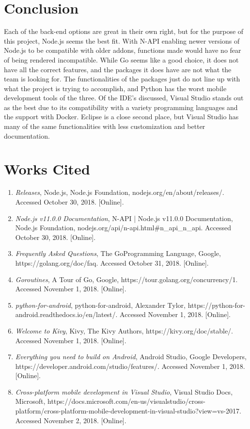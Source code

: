 \documentclass[draftclsnofoot, onecolumn, letterpaper,10pt,compsoc]{IEEEtran}
\begin{document}
\section{Conclusion}
Each of the back-end options are great in their own right, but for the purpose of this project, Node.js seems the best fit.  With N-API enabling newer versions of Node.js to be compatible with older addons, functions made would have no fear of being rendered incompatible.  While Go seems like a good choice, it does not have all the correct features, and the packages it does have are not what the team is looking for.  The functionalities of the packages just do not line up with what the project is trying to accomplish, and Python has the worst mobile development tools of the three.  Of the IDE's discussed, Visual Studio stands out as the best due to its compatibility with a variety programming languages and the support with Docker.  Eclipse is a close second place, but Visual Studio has many of the same functionalities with less customization and better documentation.
\pagebreak
\section{Works Cited}
\begin{enumerate}
\item \textit{Releases}, Node.js, Node.js Foundation, nodejs.org/en/about/releases/. Accessed October 30, 2018. [Online].
\item \textit{Node.js v11.0.0 Documentation}, N-API | Node.js v11.0.0 Documentation, Node.js Foundation, nodejs.org/api/n-api.html\#n\_api\_n\_api. Accessed October 30, 2018. [Online].
\item \textit{Frequently Asked Questions}, The GoProgramming Language, Google, https://golang.org/doc/faq. Accessed October 31, 2018. [Online].
\item \textit{Goroutines}, A Tour of Go, Google, https://tour.golang.org/concurrency/1. Accessed November 1, 2018. [Online].
\item \textit{python-for-android}, python-for-android, Alexander Tylor, https://python-for-android.readthedocs.io/en/latest/. Accessed November 1, 2018. [Online].
\item \textit{Welcome to Kivy}, Kivy, The Kivy Authors, https://kivy.org/doc/stable/. Accessed November 1, 2018. [Online].
\item \textit{Everything you need to build on Android}, Android Studio, Google Developers, https://developer.android.com/studio/features/. Accessed November 1, 2018. [Online].
\item \textit{Cross-platform mobile development in Visual Studio}, Visual Studio Docs, Microsoft, https://docs.microsoft.com/en-us/visualstudio/cross-platform/cross-platform-mobile-development-in-visual-studio?view=vs-2017. Accessed November 2, 2018. [Online].
\end{enumerate}
\end{document}
